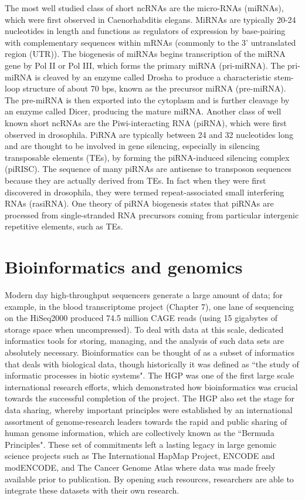 The most well studied class of short ncRNAs are the micro-RNAs (miRNAs), which were first observed in Caenorhabditis elegans\cite{pmid8252621}. MiRNAs are typically 20-24 nucleotides in length and functions as regulators of expression by base-pairing with complementary sequences within mRNAs (commonly to the 3' untranslated region (UTR)). The biogenesis of miRNAs begins transcription of the miRNA gene by Pol II or Pol III, which forms the primary miRNA (pri-miRNA). The pri-miRNA is cleaved by an enzyme called Drosha\cite{pmid14508493} to produce a characteristic stem-loop structure of about 70 bps, known as the precursor miRNA (pre-miRNA). The pre-miRNA is then exported into the cytoplasm and is further cleavage by an enzyme called Dicer\cite{pmid11201747}, producing the mature miRNA. Another class of well known short ncRNAs are the Piwi-interacting RNA (piRNA), which were first observed in drosophila\cite{pmid11470406}. PiRNA are typically between 24 and 32 nucleotides long and are thought to be involved in gene silencing, especially in silencing transposable elements (TEs), by forming the piRNA-induced silencing complex (piRISC). The sequence of many piRNAs are antisense to transposon sequences because they are actually derived from TEs. In fact when they were first discovered in drosophila, they were termed repeat-associated small interfering RNAs (rasiRNA). One theory of piRNA biogenesis states that piRNAs are processed from single-stranded RNA precursors coming from particular intergenic repetitive elements, such as TEs\cite{pmid21427766}.

\section{Bioinformatics and genomics}

Modern day high-throughput sequencers generate a large amount of data; for example, in the blood transcriptome project (Chapter 7), one lane of sequencing on the HiSeq2000 produced 74.5 million CAGE reads (using 15 gigabytes of storage space when uncompressed). To deal with data at this scale, dedicated informatics tools for storing, managing, and the analysis of such data sets are absolutely necessary. Bioinformatics can be thought of as a subset of informatics that deals with biological data, though historically it was defined as ``the study of informatic processes in biotic systems"\cite{pmid21483479}. The HGP was one of the first large scale international research efforts, which demonstrated how bioinformatics was crucial towards the successful completion of the project\cite{stein1996perl}. The HGP also set the stage for data sharing, whereby important principles were established by an international assortment of genome-research leaders towards the rapid and public sharing of human genome information, which are collectively known as the ``Bermuda Principles". These set of commitments left a lasting legacy in large genomic science projects such as The International HapMap Project, ENCODE and modENCODE, and The Cancer Genome Atlas where data was made freely available prior to publication\cite{contreras2011bermuda}. By opening such resources, researchers are able to integrate these datasets with their own research.

